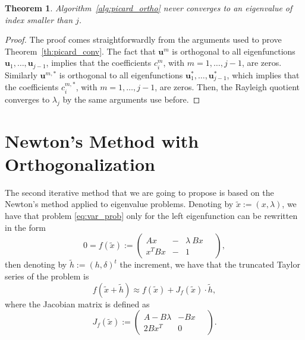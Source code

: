 \documentclass[preprint,12pt]{elsarticle}
\newtheorem{theorem}{Theorem}[section]
\begin{document}
\begin{theorem}
Algorithm~\ref{alg:picard_ortho} never converges to an eigenvalue of index smaller than $j$.
\end{theorem}

\begin{proof}
The proof comes straightforwardly from the arguments used to prove Theorem~\ref{th:picard_conv}.
The fact that $\mathbf{u}^m$ is orthogonal to all eigenfunctions $\mathbf{u}_1,\dots,\mathbf{u}_{j-1}$, implies that the coefficients $c_i^m$, with $m=1,\dots,j-1$, are zeros. Similarly $\mathbf{u}^{m,*}$ is orthogonal to all eigenfunctions $\mathbf{u}_1^*,\dots,\mathbf{u}_{j-1}^*$, which implies that the coefficients $c_i^{m,*}$, with $m=1,\dots,j-1$, are zeros.
Then, the Rayleigh quotient converges to $\lambda_j$ by the same arguments use before.
\end{proof}




\section{Newton's Method with Orthogonalization}\label{sec:newton}


The second iterative method that we are going to propose is based on the Newton's method applied to eigenvalue problems. Denoting by $\tilde x:=(x,\lambda)$, we have that problem \eqref{eq:var_prob} only for the left eigenfunction can be rewritten in the form
$$
0=f(\tilde x):=
\left(
\begin{array}{lcl}
A x&-& \lambda\ Bx
\\
  x^T Bx&-& 1
\end{array}\quad
\right) ,
$$
then denoting by $\tilde h:=(h, \delta)^t$ the increment, we have that the truncated Taylor series of the problem is
\begin{equation}\label{eq:newton}
f(\tilde x + \tilde h)\approx f(\tilde x) + J_f(\tilde x)\cdot \tilde h, 
\end{equation}
where the Jacobian matrix is defined as
$$
J_f(\tilde x):=
\left(
\begin{array}{lr}
A - B\lambda & -Bx
\\
  2Bx^T  & 0
\end{array}\quad
\right) .
$$
\end{document}
